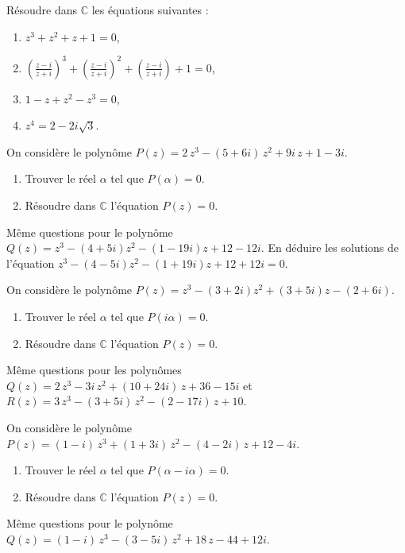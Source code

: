 %
\begin{exo}
      R\'esoudre dans $\mathbb{C}$ les \'equations suivantes : 
      \begin{enumerate}
            \item $z^3 + z^2 + z + 1 = 0$,
            \item $\left(\frac{z-i}{z+i}\right)^3+\left(\frac{z-i}{z+i}\right)^2+\left(\frac{z-i}{z+i}\right)+1 = 0$,
            \item $1-z+z^2-z^3 = 0$,
            \item $z^4 = 2 - 2 i \sqrt{3}$.
      \end{enumerate}
\end{exo}
%
\begin{exo}
      On consid\`ere le polyn\^ome $P(z) = 2\, z^3 - (5+6i)\, z^2 + 9i\, z + 1 - 3i$.
      \begin{enumerate}
            \item Trouver le r\'eel $\alpha$ tel que $P(\alpha) = 0$.
            \item R\'esoudre dans $\mathbb{C}$ l'\'equation $P(z) = 0$.
      \end{enumerate}
      M\^eme questions pour le polyn\^ome $Q(z) = z^3 - (4+5i) z^2 - (1-19i) z + 12 - 12 i$.
      En d\'eduire les solutions de l'\'equation $z^3 - (4-5i) z^2 - (1+19i) z + 12 + 12 i = 0 $.
\end{exo}
%
\begin{exo}
      On consid\`ere le polyn\^ome $P(z) = z^3 - (3+2i)z^2 + (3+5i) z - (2+6i)$.
      \begin{enumerate}
            \item Trouver le r\'eel $\alpha$ tel que $P(i\alpha) = 0$.
            \item R\'esoudre dans $\mathbb{C}$ l'\'equation $P(z) = 0$.
      \end{enumerate}
      M\^eme questions pour les polyn\^omes
      $Q(z) = 2 \, z^{3} - 3 i \, z^{2} + \left(10 + 24 i\right) \, z + 36 - 15 i$
      et 
      $R(z) = 3 \, z^{3} - \left(3 + 5 i\right) \, z^{2} - \left(2 - 17 i\right) \, z + 10$.
\end{exo}
%
\begin{exo}
      On consid\`ere le polyn\^ome 
      $P(z) = \left(1-i\right) \, z^{3} + \left(1 + 3 i\right) \, z^{2} - \left(4 - 2 i\right) \, z + 12 - 4 i$.
      \begin{enumerate}
            \item Trouver le r\'eel $\alpha$ tel que $P(\alpha - i\alpha) = 0$.
            \item R\'esoudre dans $\mathbb{C}$ l'\'equation $P(z) = 0$.
      \end{enumerate}
      M\^eme questions pour le polyn\^ome
      $Q(z) = \left(1-i\right) \, z^{3} - \left(3-5 i\right) \, z^{2} + 18 \, z - 44 + 12 i$.
\end{exo}
